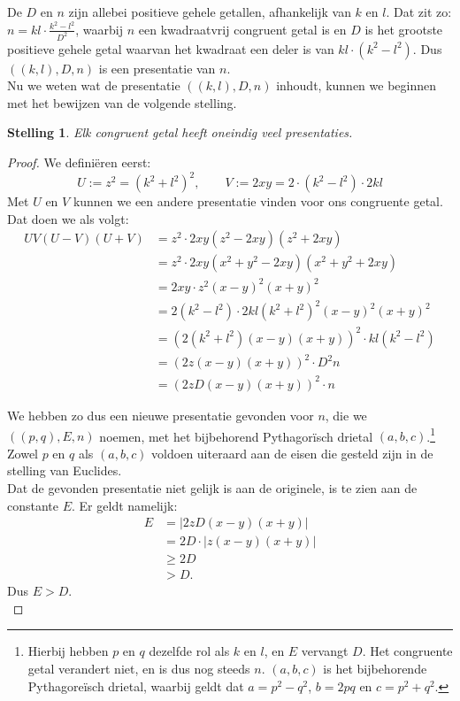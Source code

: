 \documentclass[12pt,reqno]{article}
\theoremstyle{theorem}
\newtheorem{theorem}{Stelling}
\theoremstyle{definition}
\begin{document}
	De $D$ en $n$ zijn allebei positieve gehele getallen, afhankelijk van $k$ en $l$. Dat zit zo: $n=kl\cdot \frac{k^2-l^2}{D^2}$, waarbij $n$ een kwadraatvrij congruent getal is en $D$ is het grootste positieve gehele getal waarvan het kwadraat een deler is van $kl\cdot (k^2-l^2)$. Dus $((k,l),D,n)$ is een presentatie van $n$.\\
	
	Nu we weten wat de presentatie $((k,l),D,n)$ inhoudt, kunnen we beginnen met het bewijzen van de volgende stelling.	
	\begin{theorem}
		Elk congruent getal heeft oneindig veel presentaties.
	\end{theorem}
	
	\begin{proof}
		We defini\"eren eerst:
		\begin{equation*}
			U:=z^2=(k^2+l^2)^2, \qquad V:=2xy=2\cdot(k^2-l^2)\cdot 2kl
		\end{equation*}
		Met $U$ en $V$ kunnen we een andere presentatie vinden voor ons congruente getal. Dat doen we als volgt:
		\begin{align*}
			UV (U - V) (U + V) &= z^2 \cdot 2xy (z^2 - 2xy) (z^2 + 2xy)\\
			&= z^2 \cdot 2xy (x^2 + y^2 - 2xy) (x^2 + y^2 + 2xy)\\
			&= 2xy \cdot z^2 (x - y)^2 (x + y)^2\\
			&= 2 (k^2-l^2) \cdot 2kl (k^2+l^2)^2 (x - y)^2 (x + y)^2\\
			&= (2 (k^2+l^2) (x-y) (x+y))^2 \cdot kl (k^2-l^2)\\
			&= (2 z (x - y) (x + y))^2 \cdot D^2n\\
			&= (2 z D (x - y) (x + y))^2 \cdot n
		\end{align*}
		
		We hebben zo dus een nieuwe presentatie gevonden voor $n$, die we $((p,q),E,n)$ noemen, met het bijbehorend Pythagor\"isch drietal $(a,b,c)$.\footnote{Hierbij hebben $p$ en $q$ dezelfde rol als $k$ en $l$, en $E$ vervangt $D$. Het congruente getal verandert niet, en is dus nog steeds $n$. $(a,b,c)$ is het bijbehorende Pythagore\"isch drietal, waarbij geldt dat $a=p^2-q^2$, $b=2pq$ en $c=p^2+q^2$.} Zowel $p$ en $q$ als $(a,b,c)$ voldoen uiteraard aan de eisen die gesteld zijn in de stelling van Euclides.\\
		
		Dat de gevonden presentatie niet gelijk is aan de originele, is te zien aan de constante $E$. Er geldt namelijk:
		\begin{align*}
			E &= | 2 z D (x-y) (x+y) | \\
			&= 2 D \cdot | z (x-y) (x+y) | \\
			&\geq 2 D \\
			&> D.
		\end{align*}
		Dus $E > D$.\\
		

\end{proof}
\end{document}
